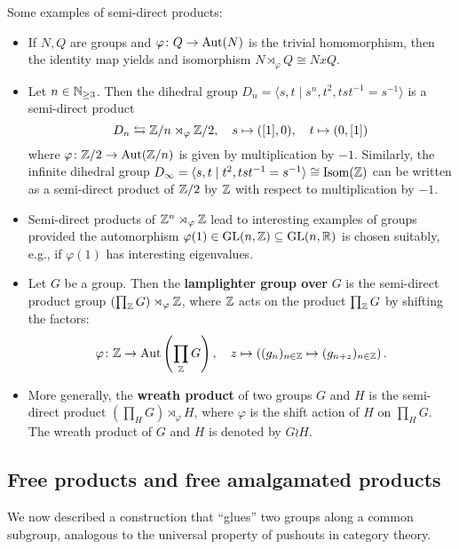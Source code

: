 \begin{example}
    Some examples of semi-direct products:
    \begin{itemize}
    \setlength\itemsep{-.2em}
        \item 
            If $N,Q$ are groups and $\varphi \colon Q\to  \mathrm{Aut}(N)$ is the trivial homomorphism, then the identity map yields and isomorphism $N \rtimes _{\varphi }Q \cong  N xQ$.
        \item Let $n \in  \mathbb{N} _{\geq 3}$. Then the dihedral group $D_n  = \langle s,t \mid s^n , t^2, tst^{-1}=s ^{-1} \rangle $ is a semi-direct product \[
                D_n \leftrightarrows \mathbb{Z} /n \rtimes _{\varphi } \mathbb{Z} /2 , \quad s \mapsto ([1], 0), \quad t \mapsto (0, [1])
            \]  where $\varphi  \colon \mathbb{Z} /2 \to \mathrm{Aut}(\mathbb{Z} /n)$ is given by multiplication by $-1$. Similarly, the infinite dihedral group $D_{\infty}=\langle s,t \mid t^2 , tst ^{-1} = s ^{-1} \rangle \cong  \mathrm{Isom}(\mathbb{Z})$ can be written as a semi-direct product of $\mathbb{Z} /2$ by $\mathbb{Z}$ with respect to multiplication by $-1$.
        \item Semi-direct products of $\mathbb{Z} ^n  \rtimes _{ \varphi } \mathbb{Z}$ lead to interesting examples of groups provided the automorphism $\varphi (1) \in \mathrm{GL}(n,\mathbb{Z}) \subseteq \mathrm{GL}(n, \mathbb{R})$ is chosen suitably, e.g., if $\varphi (1)$ has interesting eigenvalues.
        \item Let $G$ be a group. Then the \textbf{lamplighter group over} $G$ is the semi-direct product group $\left( \prod _{\mathbb{Z}} G\right) \rtimes _{\varphi }\mathbb{Z}$, where $\mathbb{Z}$ acts on the product $\prod _{\mathbb{Z}}G$ by shifting the factors: \[
                \varphi  \colon \mathbb{Z} \to \mathrm{Aut}\left( \prod _{\mathbb{Z}}G \right) , \quad z \mapsto \left( (g_n ) _{n \in \mathbb{Z}} \mapsto (g _{n+z}) _{n \in \mathbb{Z}} \right) .
        \] 
    \item More generally, the \textbf{wreath product} of two groups $G$ and $H$ is the semi-direct product $\left( \prod _HG \right) \rtimes _{\varphi }H$, where $\varphi $ is the shift action of $H$ on $\prod _HG$. The wreath product of $G$ and $H$ is denoted by $G \wr H$.
    \end{itemize}
\end{example}

\subsection{Free products and free amalgamated products}
We now described a construction that ``glues'' two groups along a common subgroup, analogous to the universal property of pushouts in category theory.

